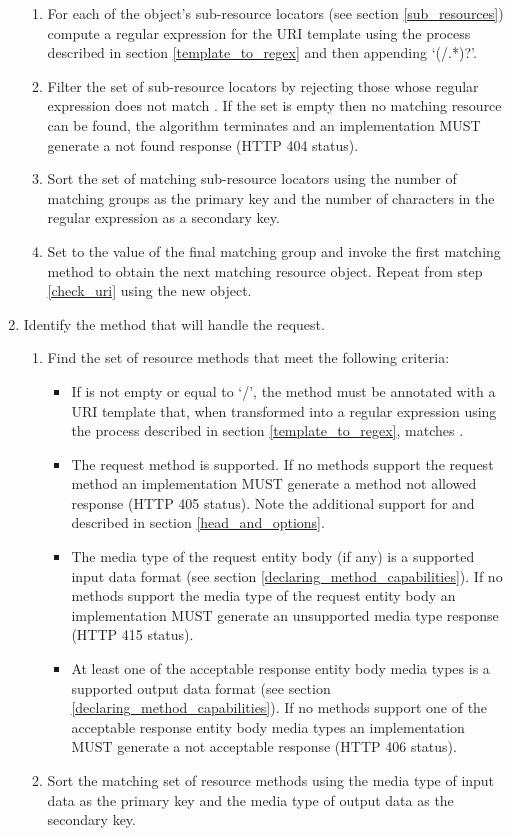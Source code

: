 \begin{enumerate}
\begin{enumerate}
\item For each of the object's sub-resource locators (see section \ref{sub_resources}) compute a regular expression for the URI template using the process described in section \ref{template_to_regex} and then appending \lq(/.*)?\rq.

\item Filter the set of sub-resource locators by rejecting those whose regular expression does not match . If the set is empty then no matching resource can be found, the algorithm terminates and an implementation MUST generate a not found response (HTTP 404 status).

\item Sort the set of matching sub-resource locators using the number of matching groups as the primary key and the number of characters in the regular expression as a secondary key.

\item Set  to the value of the final matching group and invoke the first matching method to obtain the next matching resource object. Repeat from step \ref{check_uri} using the new object.
\end{enumerate}

\item \label{find_method} Identify the method that will handle the request.

\begin{enumerate}
\item Find the set of resource methods that meet the following criteria:
\begin{itemize}
\item If  is not empty or equal to \lq/\rq, the method must be annotated with  a URI template that, when transformed into a regular expression using the process described in section \ref{template_to_regex}, matches .
\item The request method is supported. If no methods support the request method an implementation MUST generate a method not allowed response (HTTP 405 status). Note the additional support for  and  described in section \ref{head_and_options}.
\item The media type of the request entity body (if any) is a supported input data format (see section \ref{declaring_method_capabilities}). If no methods support the media type of the request entity body an implementation MUST generate an unsupported media type response (HTTP 415 status).
\item At least one of the acceptable response entity body media types is a supported output data format (see section \ref{declaring_method_capabilities}). If no methods support one of the acceptable response entity body media types an implementation MUST generate a not acceptable response (HTTP 406 status).
\end{itemize} 
\item Sort the matching set of resource methods using the media type of input data as the primary key and the media type of output data as the secondary key.


\end{enumerate}
\end{enumerate}
